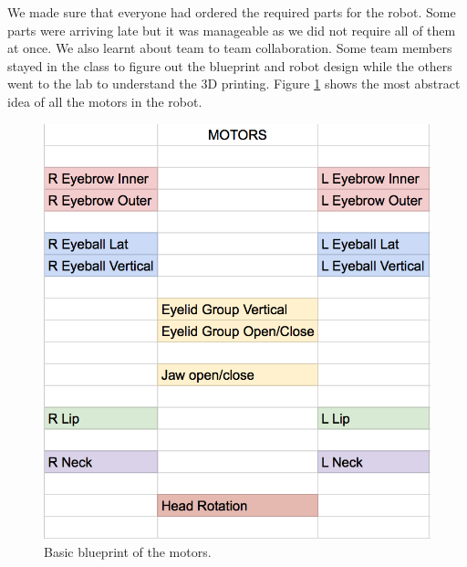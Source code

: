 \documentclass[index=totoc,hyperref,openany]{labbook} %
\begin{document}
{\let\clearpage\relax {}}

 We made sure that everyone had ordered the required parts for the robot. Some parts were arriving late but it was manageable as we did not require all of them at once. We also learnt about team to team collaboration. Some team members stayed in the class to figure out the blueprint and robot design while the others went to the lab to understand the 3D printing. Figure \ref{fig:blue_print} shows the most abstract idea of all the motors in the robot.

\begin{figure}[H] %
\begin{center}
\includegraphics[width=0.5\linewidth]{blue_print}
\end{center}
\caption{Basic blueprint of the motors.}
\label{fig:blue_print}
\end{figure}


{\let\clearpage\relax {}}
\end{document}
